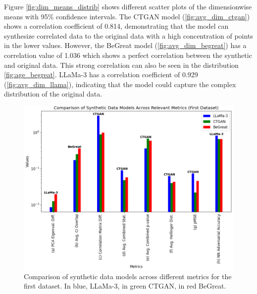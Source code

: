 Figure \ref{fig:dim_means_distrib} shows different scatter plots of the dimensionwise means with 95\% confidence intervals. The CTGAN model (\ref{fig:avg_dim_ctgan}) shows a correlation coefficient of 0.814, demonstrating that the model can synthesize correlated data to the original data with a high concentration of points in the lower values. However, the BeGreat model (\ref{fig:avg_dim_begreat}) has a correlation value of 1.036 which shows a perfect correlation between the synthetic and original data. This strong correlation can also be seen in the distribution \ref{fig:age_begreat}. LLaMa-3 has a correlation coefficient of 0.929 (\ref{fig:avg_dim_llama}), indicating that the model could capture the complex distribution of the original data.



\vspace{0.5cm}


\begin{figure}[H]
    \centering
        \centering
        \includegraphics[width=1\textwidth]{images/dataset1_metrics.png}
        \caption{Comparison of synthetic data models across different metrics for the first dataset. In blue, LLaMa-3, in green CTGAN, in red BeGreat.}
        \label{fig:dataset1_metrics}
\end{figure}

